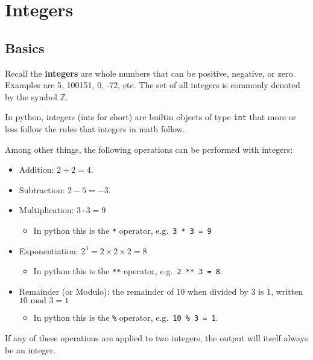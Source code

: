 \documentclass[
  letterpaper,
  DIV=11,
  numbers=noendperiod]{scrreprt}
\providecommand{\tightlist}{%
  \setlength{\itemsep}{0pt}\setlength{\parskip}{0pt}}\usepackage{longtable,booktabs,array}
\begin{document}
\hypertarget{integers}{%
\section{Integers}\label{integers}}

\hypertarget{basics}{%
\subsection{Basics}\label{basics}}

Recall the \textbf{integers} are whole numbers that can be positive,
negative, or zero. Examples are 5, 100151, 0, -72, etc. The set of all
integers is commonly denoted by the symbol \(\mathbb{Z}\).

In python, integers (ints for short) are builtin objects of type
\texttt{int} that more or less follow the rules that integers in math
follow.

Among other things, the following operations can be performed with
integers:

\begin{itemize}
\tightlist
\item
  Addition: \(2 + 2 = 4\).
\item
  Subtraction: \(2 - 5 = -3\).
\item
  Multiplication: \(3 \cdot 3 = 9\)

  \begin{itemize}
  \tightlist
  \item
    In python this is the \texttt{*} operator,
    e.g.~\texttt{3\ *\ 3\ =\ 9}
  \end{itemize}
\item
  Exponentiation: \(2^3 = 2 \times 2 \times 2 = 8\)

  \begin{itemize}
  \tightlist
  \item
    In python this is the \texttt{**} operator,
    e.g.~\texttt{2\ **\ 3\ =\ 8}.
  \end{itemize}
\item
  Remainder (or Modulo): the remainder of 10 when divided by 3 is 1,
  written \(10 \text{ mod } 3 = 1\)

  \begin{itemize}
  \tightlist
  \item
    In python this is the \texttt{\%} operator,
    e.g.~\texttt{10\ \%\ 3\ =\ 1}.
  \end{itemize}
\end{itemize}

If any of these operations are applied to two integers, the output will
itself always be an integer.
\end{document}

